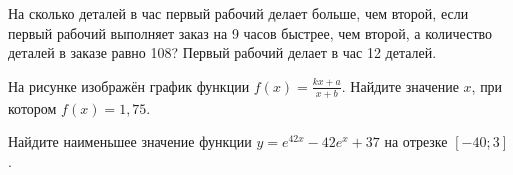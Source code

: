 \begin{taskBN}{9}
На сколько деталей в час первый рабочий делает больше, чем второй, если первый рабочий выполняет заказ на 9 часов быстрее, чем второй, а количество деталей в заказе равно 108? Первый рабочий делает в час 12 деталей. 
\end{taskBN}

\begin{taskBN}{10}
На рисунке изображён график функции $f(x)=\frac{kx+a}{x+b}$. Найдите значение $x$, при котором $f(x)=1{,}75$.
\end{taskBN}

\begin{taskBN}{11}
Найдите наименьшее значение функции $y=e^{42x}-42e^x+37$ на отрезке $[-40; 3]$.
\end{taskBN}

